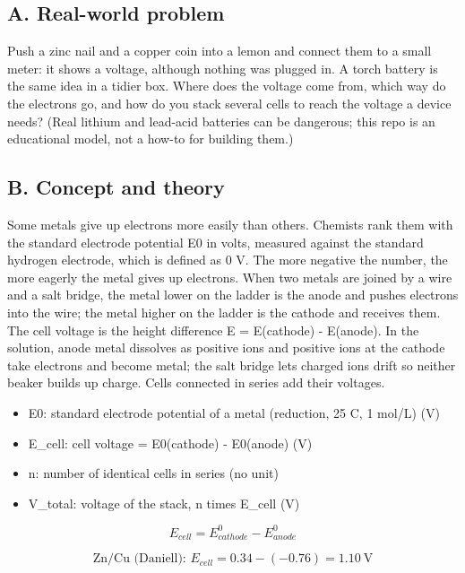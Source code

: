 \documentclass[11pt,a4paper]{article}
\begin{document}
\subsection*{A. Real-world problem}
Push a zinc nail and a copper coin into a lemon and connect them to a small meter: it shows a voltage, although nothing was plugged in. A torch battery is the same idea in a tidier box. Where does the voltage come from, which way do the electrons go, and how do you stack several cells to reach the voltage a device needs? (Real lithium and lead-acid batteries can be dangerous; this repo is an educational model, not a how-to for building them.)

\subsection*{B. Concept and theory}
Some metals give up electrons more easily than others. Chemists rank them with the standard electrode potential E0 in volts, measured against the standard hydrogen electrode, which is defined as 0 V. The more negative the number, the more eagerly the metal gives up electrons. When two metals are joined by a wire and a salt bridge, the metal lower on the ladder is the anode and pushes electrons into the wire; the metal higher on the ladder is the cathode and receives them. The cell voltage is the height difference E = E(cathode) - E(anode). In the solution, anode metal dissolves as positive ions and positive ions at the cathode take electrons and become metal; the salt bridge lets charged ions drift so neither beaker builds up charge. Cells connected in series add their voltages.

\begin{itemize}[nosep]
\item E0: standard electrode potential of a metal (reduction, 25 C, 1 mol/L) (V)
\item E\_cell: cell voltage = E0(cathode) - E0(anode) (V)
\item n: number of identical cells in series (no unit)
\item V\_total: voltage of the stack, n times E\_cell (V)
\end{itemize}

\begin{equation*}
E_{cell}=E^{0}_{cathode}-E^{0}_{anode}
\end{equation*}

\begin{equation*}
\text{Zn/Cu (Daniell): } E_{cell}=0.34-(-0.76)=1.10\ \mathrm{V}
\end{equation*}
\end{document}
